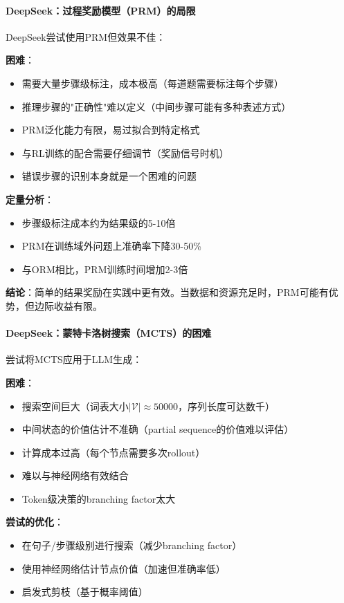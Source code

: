 \documentclass[12pt,a4paper]{article}
\begin{document}
\paragraph{DeepSeek：过程奖励模型（PRM）的局限}

DeepSeek尝试使用PRM但效果不佳：

\textbf{困难}：
\begin{itemize}
    \item 需要大量步骤级标注，成本极高（每道题需要标注每个步骤）
    \item 推理步骤的"正确性"难以定义（中间步骤可能有多种表述方式）
    \item PRM泛化能力有限，易过拟合到特定格式
    \item 与RL训练的配合需要仔细调节（奖励信号时机）
    \item 错误步骤的识别本身就是一个困难的问题
\end{itemize}

\textbf{定量分析}：
\begin{itemize}
    \item 步骤级标注成本约为结果级的5-10倍
    \item PRM在训练域外问题上准确率下降30-50\%
    \item 与ORM相比，PRM训练时间增加2-3倍
\end{itemize}

\textbf{结论}：简单的结果奖励在实践中更有效。当数据和资源充足时，PRM可能有优势，但边际收益有限。

\paragraph{DeepSeek：蒙特卡洛树搜索（MCTS）的困难}

尝试将MCTS应用于LLM生成：

\textbf{困难}：
\begin{itemize}
    \item 搜索空间巨大（词表大小$|\mathcal{V}| \approx 50000$，序列长度可达数千）
    \item 中间状态的价值估计不准确（partial sequence的价值难以评估）
    \item 计算成本过高（每个节点需要多次rollout）
    \item 难以与神经网络有效结合
    \item Token级决策的branching factor太大
\end{itemize}

\textbf{尝试的优化}：
\begin{itemize}
    \item 在句子/步骤级别进行搜索（减少branching factor）
    \item 使用神经网络估计节点价值（加速但准确率低）
    \item 启发式剪枝（基于概率阈值）
\end{itemize}
\end{document}
